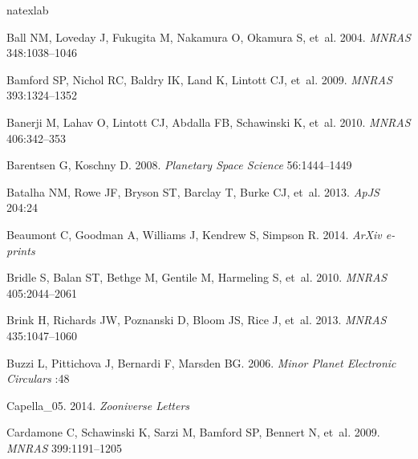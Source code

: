\documentclass{ar2e}
\def\apjs{ApJS}
\def\mnras{MNRAS}
\def\planss{Planetary Space Science}
\begin{document}
\begin{thebibliography}{}
\expandafter\ifx\csname natexlab\endcsname\relax\def\natexlab#1{#1}\fi

{Ball} NM, {Loveday} J, {Fukugita} M, {Nakamura} O, {Okamura} S, et~al. 2004.
\newblock \textit{\mnras} 348:1038--1046

{Bamford} SP, {Nichol} RC, {Baldry} IK, {Land} K, {Lintott} CJ, et~al. 2009.
\newblock \textit{\mnras} 393:1324--1352

{Banerji} M, {Lahav} O, {Lintott} CJ, {Abdalla} FB, {Schawinski} K, et~al.
  2010.
\newblock \textit{\mnras} 406:342--353

{Barentsen} G, {Koschny} D. 2008.
\newblock \textit{\planss} 56:1444--1449

{Batalha} NM, {Rowe} JF, {Bryson} ST, {Barclay} T, {Burke} CJ, et~al. 2013.
\newblock \textit{\apjs} 204:24

{Beaumont} C, {Goodman} A, {Williams} J, {Kendrew} S, {Simpson} R. 2014.
\newblock \textit{ArXiv e-prints}

{Bridle} S, {Balan} ST, {Bethge} M, {Gentile} M, {Harmeling} S, et~al. 2010.
\newblock \textit{\mnras} 405:2044--2061

{Brink} H, {Richards} JW, {Poznanski} D, {Bloom} JS, {Rice} J, et~al. 2013.
\newblock \textit{\mnras} 435:1047--1060

{Buzzi} L, {Pittichova} J, {Bernardi} F, {Marsden} BG. 2006.
\newblock \textit{Minor Planet Electronic Circulars} :48

{Capella\_05}. 2014.
\newblock \textit{Zooniverse Letters}

{Cardamone} C, {Schawinski} K, {Sarzi} M, {Bamford} SP, {Bennert} N, et~al.
  2009.
\newblock \textit{\mnras} 399:1191--1205


\end{thebibliography}
\end{document}
